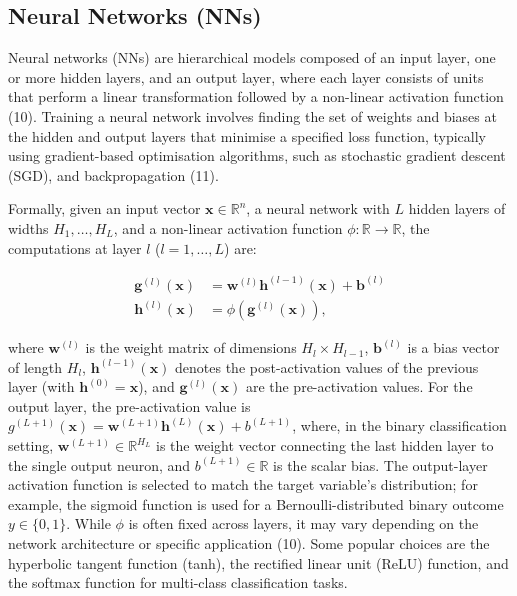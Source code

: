 \documentclass[
  a4paper,
]{scrreprt}
\begin{document}
\subsection{Neural Networks (NNs)}\label{neural-networks-nns}

Neural networks (NNs) are hierarchical models composed of an input
layer, one or more hidden layers, and an output layer, where each layer
consists of units that perform a linear transformation followed by a
non-linear activation function (10). Training a neural network involves
finding the set of weights and biases at the hidden and output layers
that minimise a specified loss function, typically using gradient-based
optimisation algorithms, such as stochastic gradient descent (SGD), and
backpropagation (11).

Formally, given an input vector \(\mathbf{x} \in \mathbb{R}^n\), a
neural network with \(L\) hidden layers of widths \(H_1, \dots, H_L\),
and a non-linear activation function
\(\phi: \mathbb{R} \rightarrow \mathbb{R}\), the computations at layer
\(l\) (\(l = 1, \dots, L\)) are:

\[
\begin{aligned}
\mathbf{g}^{(l)}(\mathbf{x}) &= \mathbf{w}^{(l)} \mathbf{h}^{(l-1)}(\mathbf{x}) + \mathbf{b}^{(l)} \\
\mathbf{h}^{(l)}(\mathbf{x}) &= \phi\left(\mathbf{g}^{(l)}(\mathbf{x})\right),
\end{aligned}
\]

where \(\mathbf{w}^{(l)}\) is the weight matrix of dimensions
\(H_l \times H_{l-1}\), \(\mathbf{b}^{(l)}\) is a bias vector of length
\(H_l\), \(\mathbf{h}^{(l-1)}(\mathbf{x})\) denotes the post-activation
values of the previous layer (with \(\mathbf{h}^{(0)} = \mathbf{x}\)),
and \(\mathbf{g}^{(l)}(\mathbf{x})\) are the pre-activation values. For
the output layer, the pre-activation value is
\(g^{(L+1)}(\mathbf{x}) = \mathbf{w}^{(L+1)} \mathbf{h}^{(L)}(\mathbf{x}) + b^{(L+1)}\),
where, in the binary classification setting,
\(\mathbf{w}^{(L+1)} \in \mathbb{R}^{H_L}\) is the weight vector
connecting the last hidden layer to the single output neuron, and
\(b^{(L+1)} \in \mathbb{R}\) is the scalar bias. The output-layer
activation function is selected to match the target variable's
distribution; for example, the sigmoid function is used for a
Bernoulli-distributed binary outcome \(y \in \{0,1\}\). While \(\phi\)
is often fixed across layers, it may vary depending on the network
architecture or specific application (10). Some popular choices are the
hyperbolic tangent function (tanh), the rectified linear unit (ReLU)
function, and the softmax function for multi-class classification tasks.
\end{document}
